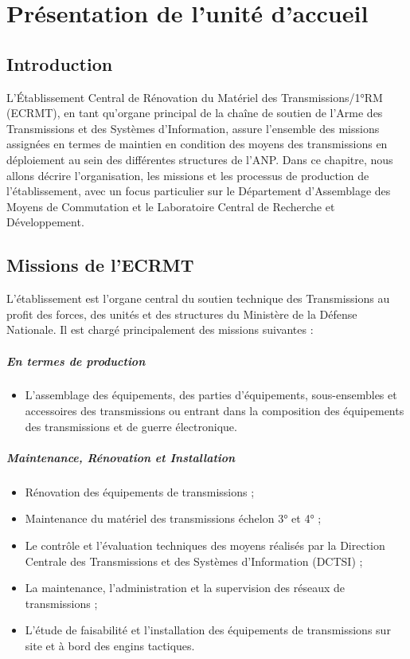 
\chapter{Présentation de l'unité d'accueil}
\label{chap:presentation_unite}

\section{Introduction}
\label{sec:intro_ch1}

L’Établissement Central de Rénovation du Matériel des Transmissions/1°RM (ECRMT), en tant qu’organe principal de la chaîne de soutien de l’Arme des Transmissions et des Systèmes d’Information, assure l’ensemble des missions assignées en termes de maintien en condition des moyens des transmissions en déploiement au sein des différentes structures de l’ANP. Dans ce chapitre, nous allons décrire l’organisation, les missions et les processus de production de l’établissement, avec un focus particulier sur le Département d’Assemblage des Moyens de Commutation et le Laboratoire Central de Recherche et Développement.

\section{Missions de l'ECRMT}
\label{sec:missions_ecrmt}

L’établissement est l’organe central du soutien technique des Transmissions au profit des forces, des unités et des structures du Ministère de la Défense Nationale. Il est chargé principalement des missions suivantes :

\paragraph{En termes de production}
\begin{itemize}
    \item L’assemblage des équipements, des parties d’équipements, sous-ensembles et accessoires des transmissions ou entrant dans la composition des équipements des transmissions et de guerre électronique.
\end{itemize}

\paragraph{Maintenance, Rénovation et Installation}
\begin{itemize}
    \item Rénovation des équipements de transmissions ;
    \item Maintenance du matériel des transmissions échelon 3° et 4° ;
    \item Le contrôle et l’évaluation techniques des moyens réalisés par la Direction Centrale des Transmissions et des Systèmes d’Information (DCTSI) ;
    \item La maintenance, l’administration et la supervision des réseaux de transmissions ;
    \item L’étude de faisabilité et l’installation des équipements de transmissions sur site et à bord des engins tactiques.
\end{itemize}

